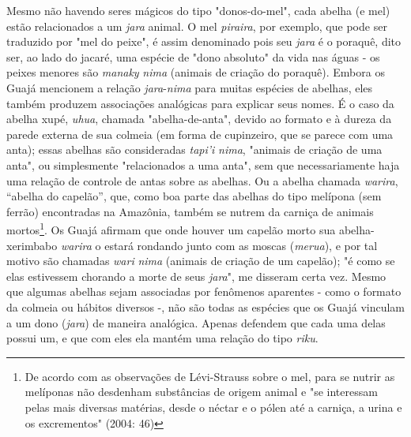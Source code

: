Mesmo não havendo seres mágicos do tipo "donos-do-mel", cada abelha (e
mel) estão relacionados a um \emph{jara} animal. O mel \emph{piraira},
por exemplo, que pode ser traduzido por "mel do peixe", é assim
denominado pois seu \emph{jara} é o poraquê, dito ser, ao lado do
jacaré, uma espécie de "dono absoluto" da vida nas águas - os peixes
menores são \emph{manaky} \emph{nima} (animais de criação do poraquê).
Embora os Guajá mencionem a relação \emph{jara}-\emph{nima} para muitas
espécies de abelhas, eles também produzem associações analógicas para
explicar seus nomes. É o caso da abelha xupé, \emph{uhua}, chamada
"abelha-de-anta", devido ao formato e à dureza da parede externa de sua
colmeia (em forma de cupinzeiro, que se parece com uma anta); essas
abelhas são consideradas \emph{tapi'i} \emph{nima}, "animais de criação
de uma anta", ou simplesmente "relacionados a uma anta", sem que
necessariamente haja uma relação de controle de antas sobre as abelhas.
Ou a abelha chamada \emph{warira}, ``abelha do capelão'', que, como boa
parte das abelhas do tipo melípona (sem ferrão) encontradas na Amazônia,
também se nutrem da carniça de animais mortos\footnote{De acordo com as
  observações de Lévi-Strauss sobre o mel, para se nutrir as melíponas
  não desdenham substâncias de origem animal e "se interessam pelas mais
  diversas matérias, desde o néctar e o pólen até a carniça, a urina e
  os excrementos" (2004: 46)}. Os Guajá afirmam que onde houver um
capelão morto sua abelha-xerimbabo \emph{warira} o estará rondando junto
com as moscas (\emph{merua}), e por tal motivo são chamadas \emph{wari}
\emph{nima} (animais de criação de um capelão); "é como se elas
estivessem chorando a morte de seus \emph{jara}", me disseram certa vez.
Mesmo que algumas abelhas sejam associadas por fenômenos aparentes -
como o formato da colmeia ou hábitos diversos -, não são todas as
espécies que os Guajá vinculam a um dono (\emph{jara}) de maneira
analógica. Apenas defendem que cada uma delas possui um, e que com eles
ela mantém uma relação do tipo \emph{riku}.

